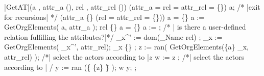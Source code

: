 	{\small
	\NumberProgramstrue
	\begin{algorithm}[GetAT]\label{alg:GetAT}
	\begin{program}
	\FUNCT |GetAT|(a \subset \a, attr_a \subset (\Bezeichner \times \WerteMenge), rel \in \relname, attr_{rel} \subset (\Bezeichner \times \WerteMenge)) \subset \a 
	\BEGIN
	\IF (attr_a = rel = attr_{rel} = \{\})\label{alg:GetAT:trivial}
	\THEN \RETURN \quad a;
	\FI
	/* |exit for recursions| */
	\IF (attr_a \neq \{\} \wedge (rel = attr_{rel} = \{\})) \label{alg:GetAT:Aussprung}
	\THEN
		\IF a = \{\} \THEN a := \a \FI \label{alg:GetAT:A-Erweiterung}
		\RETURN \quad  GetOrgElements( a, attr_a ); \label{alg:GetAT:1}
	\FI
	\IF rel \neq \{\} \label{alg:GetAT:komplex}
	\THEN
		\IF a = \{\} \THEN a := \a \FI
		\var {};
		/* | is there a user-defined relation fulfilling the attributes?|*/
		\rel_x^{'} := dom(\rel_{Name} \rhd rel) \cap \relmengebenutzerFA; \label{alg:GetAT:FA}
		\rel_x := GetOrgElements( \rel_x^{'}, attr_{rel});
		\IF \rel_x \neq \{\} 
		\THEN
			\var {};
			z := ran( GetOrgElements(\{a\} \lhd \rel_x, attr_{rel}) );
			/*| select the actors according to |$z$
			w := z \cap \a;
			/*| select the actors according to | \relstrukturFA */
			y := ran (\{ \{z\} \cap \f\} \lhd \relstrukturFA);
			\RETURN \quad w \cup y;
		\ELSE
			\var {};

\end{program}
\end{algorithm}}
